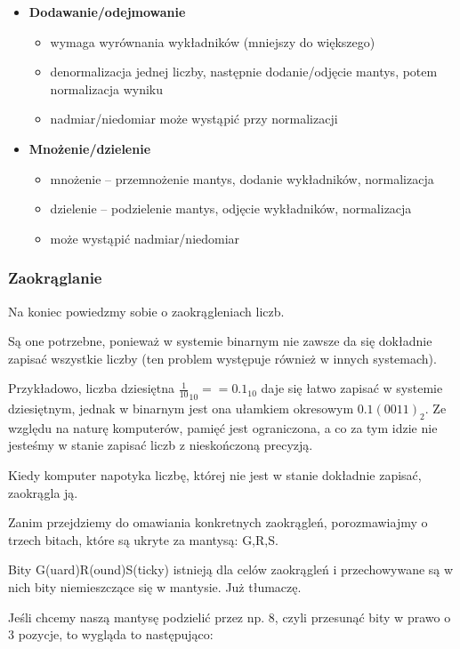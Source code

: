 \begin{itemize}
	\setlength\itemsep{1pt}
	\item \textbf{Dodawanie/odejmowanie}
	\begin{itemize}
		\setlength\itemsep{1pt}
		\item wymaga wyrównania wykładników (mniejszy do większego)
		\item denormalizacja jednej liczby, następnie dodanie/odjęcie mantys, potem normalizacja wyniku
		\item nadmiar/niedomiar może wystąpić przy normalizacji
	\end{itemize}
	\item \textbf{Mnożenie/dzielenie}
	\begin{itemize}
		\setlength\itemsep{1pt}
		\item mnożenie -- przemnożenie mantys, dodanie wykładników, normalizacja
		\item dzielenie -- podzielenie mantys, odjęcie wykładników, normalizacja
		\item może wystąpić nadmiar/niedomiar
	\end{itemize}
\end{itemize}

\subsubsection{Zaokrąglanie}
Na koniec powiedzmy sobie o zaokrągleniach liczb.

Są one potrzebne, ponieważ w systemie binarnym nie zawsze da się dokładnie zapisać wszystkie liczby (ten problem występuje również w innych systemach).

Przykładowo, liczba dziesiętna $\frac{1}{10}_{10} == 0.1_{10}$ daje się łatwo zapisać w systemie dziesiętnym, jednak w binarnym jest ona ułamkiem okresowym $0.1(0011)_2$.
Ze względu na naturę komputerów, pamięć jest ograniczona, a co za tym idzie nie jesteśmy w stanie zapisać liczb z nieskończoną precyzją.

Kiedy komputer napotyka liczbę, której nie jest w stanie dokładnie zapisać, zaokrągla ją.

Zanim przejdziemy do omawiania konkretnych zaokrągleń, porozmawiajmy o trzech bitach, które są ukryte za mantysą: G,R,S.

Bity G(uard)R(ound)S(ticky) istnieją dla celów zaokrągleń i przechowywane są w nich bity niemieszczące się w mantysie. Już tłumaczę.

Jeśli chcemy naszą mantysę podzielić przez np. 8, czyli przesunąć bity w prawo o 3 pozycje, to wygląda to następująco:

